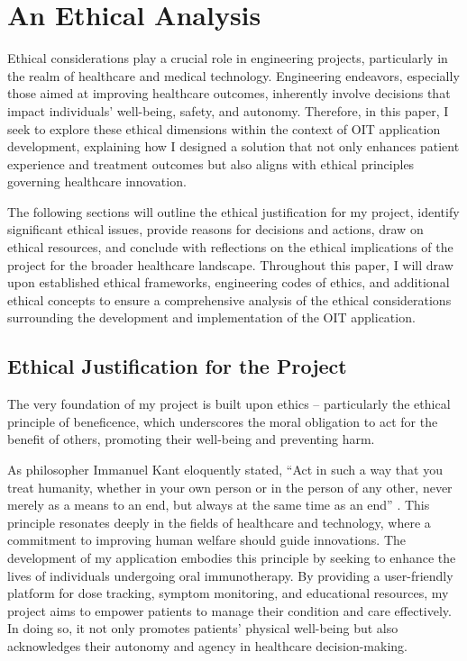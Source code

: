 \chapter{An Ethical Analysis}
\label{section:ethics}

Ethical considerations play a crucial role in engineering projects, particularly in the realm of healthcare and medical technology. Engineering endeavors, especially those aimed at improving healthcare outcomes, inherently involve decisions that impact individuals' well-being, safety, and autonomy. Therefore, in this paper, I seek to explore these ethical dimensions within the context of OIT application development, explaining how I designed a solution that not only enhances patient experience and treatment outcomes but also aligns with ethical principles governing healthcare innovation.

The following sections will outline the ethical justification for my project, identify significant ethical issues, provide reasons for decisions and actions, draw on ethical resources, and conclude with reflections on the ethical implications of the project for the broader healthcare landscape. Throughout this paper, I will draw upon established ethical frameworks, engineering codes of ethics, and additional ethical concepts to ensure a comprehensive analysis of the ethical considerations surrounding the development and implementation of the OIT application.

\section{Ethical Justification for the Project}

The very foundation of my project is built upon ethics – particularly the ethical principle of beneficence, which underscores the moral obligation to act for the benefit of others, promoting their well-being and preventing harm. 

As philosopher Immanuel Kant eloquently stated, ``Act in such a way that you treat humanity, whether in your own person or in the person of any other, never merely as a means to an end, but always at the same time as an end'' \cite{Kant}. This principle resonates deeply in the fields of healthcare and technology, where a commitment to improving human welfare should guide innovations. The development of my application embodies this principle by seeking to enhance the lives of individuals undergoing oral immunotherapy. By providing a user-friendly platform for dose tracking, symptom monitoring, and educational resources, my project aims to empower patients to manage their condition and care effectively. In doing so, it not only promotes patients' physical well-being but also acknowledges their autonomy and agency in healthcare decision-making. 

